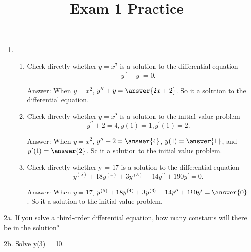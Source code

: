 \documentclass{ximera}
\begin{document}
\title[Math 240:]{Exam 1 Practice}

\begin{enumerate}
	
\item

	\begin{enumerate}
	
	\item Check directly whether $y = x^2$ is a solution to the differential equation
	$$y^{\prime\prime} + y^\prime = 0.$$
	
	\vfill
	
	Answer: When $y = x^2$, $y^{\prime\prime} + y = \answer{2x+2}$. So it 
	a solution to the differential equation.
	
	\item Check directly whether $y = x^2$ is a solution to the initial value problem
	$$y^{\prime\prime} + 2 = 4,     y(1) = 1,    y^\prime(1) = 2.$$
	
	\vfill
	
	Answer: When $y = x^2$, $y^{\prime\prime} + 2 = \answer{4}$, $y(1) = \answer{1}$, and $y^\prime(1) = \answer{2}$. So it 
	a solution to the initial value problem.
	
	\item Check directly whether y = 17 is a solution to the differential equation
	$$y^{(5)} + 18y^{(4)} + 3y^{(3)} -14y^{\prime\prime} + 190y^\prime = 0.$$
	
	\vfill
	
	Answer: When $y = 17$, $y^{(5)} + 18y^{(4)} + 3y^{(3)} -14y^{\prime\prime} + 190y^\prime =  \answer{0}$. So it 
	a solution to the initial value problem.

	\end{enumerate}



\end{enumerate}



2a. If you solve a third-order differential equation, how many constants will there be in the solution?










2b. Solve y(3) = 10.
\end{document}
